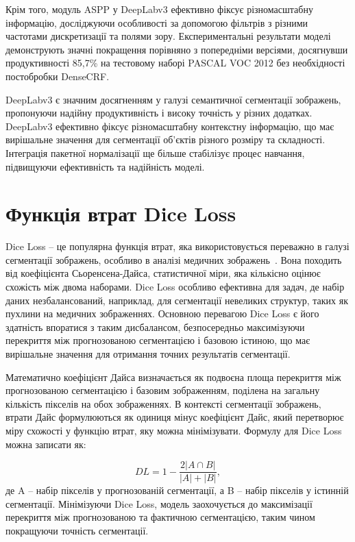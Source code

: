 Крім того, модуль ASPP у DeepLabv3 ефективно фіксує різномасштабну
інформацію, досліджуючи особливості за допомогою фільтрів з
різними частотами дискретизації та полями зору. Експериментальні
результати моделі демонструють значні покращення порівняно з
попередніми версіями, досягнувши продуктивності 85,7\% на тестовому
наборі PASCAL VOC 2012 без необхідності постобробки DenseCRF.

DeepLabv3 є значним досягненням у галузі семантичної сегментації зображень,
пропонуючи надійну продуктивність і високу точність у різних додатках.
DeepLabv3 ефективно фіксує різномасштабну контекстну інформацію, що має
вирішальне значення для сегментації об'єктів різного розміру та складності.
Інтеграція пакетної нормалізації ще більше стабілізує процес навчання,
підвищуючи ефективність та надійність моделі.

\section{Функція втрат Dice Loss}

Dice Loss -- це популярна функція втрат, яка використовується переважно в
галузі сегментації зображень, особливо в аналізі медичних
зображень~\cite{zhang2021}. Вона походить від коефіцієнта Сьоренсена-Дайса,
статистичної міри, яка кількісно оцінює схожість між двома наборами. Dice Loss
особливо ефективна для задач, де набір даних незбалансований, наприклад, для
сегментації невеликих структур, таких як пухлини на медичних зображеннях.
Основною перевагою Dice Loss є його здатність впоратися з таким дисбалансом,
безпосередньо максимізуючи перекриття між прогнозованою сегментацією і базовою
істиною, що має вирішальне значення для отримання точних результатів
сегментації.

Математично коефіцієнт Дайса визначається як подвоєна
площа перекриття між прогнозованою сегментацією
і базовим зображенням, поділена на загальну кількість
пікселів на обох зображеннях. В контексті сегментації
зображень, втрати Дайс формулюються як одиниця мінус
коефіцієнт Дайс, який перетворює міру схожості у
функцію втрат, яку можна мінімізувати. Формулу для
Dice Loss можна записати як:

\begin{equation*}
    DL = 1 - \frac{2|A \cap B|}{|A| + |B|},
\end{equation*}
де A -- набір пікселів у прогнозованій сегментації,
а B -- набір пікселів у істинній сегментації.
Мінімізуючи Dice Loss, модель заохочується
до максимізації перекриття між прогнозованою
та фактичною сегментацією, таким чином покращуючи
точність сегментації.

